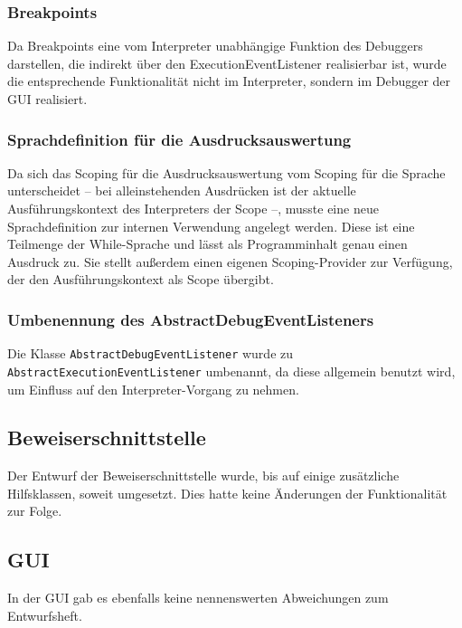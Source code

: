 \subsubsection{Breakpoints\label{aenderung_interpreter_breakpoints}}
Da Breakpoints eine vom Interpreter unabhängige Funktion des Debuggers darstellen, die indirekt über den ExecutionEventListener realisierbar ist, wurde die entsprechende Funktionalität nicht im Interpreter, sondern im Debugger der GUI realisiert.

\subsubsection{Sprachdefinition für die Ausdrucksauswertung}
Da sich das Scoping für die Ausdrucksauswertung vom Scoping für die Sprache unterscheidet -- bei alleinstehenden Ausdrücken ist der aktuelle Ausführungskontext des Interpreters der Scope --, musste eine neue Sprachdefinition zur internen Verwendung angelegt werden. Diese ist eine Teilmenge der While-Sprache und lässt als Programminhalt genau einen Ausdruck zu. Sie stellt außerdem einen eigenen Scoping-Provider zur Verfügung, der den Ausführungskontext als Scope übergibt.

\subsubsection{Umbenennung des AbstractDebugEventListeners}
Die Klasse \texttt{AbstractDebugEventListener} wurde zu \\ \texttt{AbstractExecutionEventListener} umbenannt, da diese allgemein benutzt wird, um Einfluss auf den Interpreter-Vorgang zu nehmen.

\subsection{Beweiserschnittstelle}
Der Entwurf der Beweiserschnittstelle wurde, bis auf einige zusätzliche Hilfsklassen, soweit umgesetzt. Dies hatte keine Änderungen der Funktionalität zur Folge.

\subsection{GUI}
In der GUI gab es ebenfalls keine nennenswerten Abweichungen zum Entwurfsheft.
